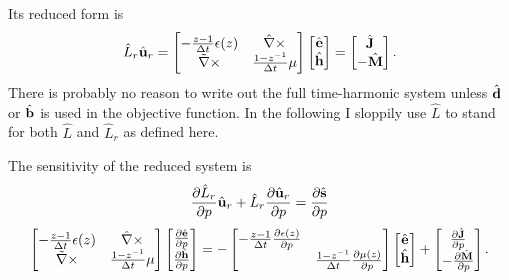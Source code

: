 %
Its reduced form is
%
\begin{equation}
	\hat{L}_r \hat{\textbf{u}}_r =
	\begin{bmatrix}
	-\frac{z - 1}{\Delta t} \epsilon(z) & \hat{\nabla}\times \\
	\tilde{\nabla}\times & \frac{1 - z^{-1}}{\Delta t} \mu
	\end{bmatrix}
	\begin{bmatrix} \hat{\textbf{e}} \\ \hat{\textbf{h}} \end{bmatrix}
	=
	\begin{bmatrix} \hat{\textbf{J}} \\ -\hat{\textbf{M}} \end{bmatrix}.
\end{equation}
%
There is probably no reason to write out the full time-harmonic system unless $\hat{\textbf{d}}$ or $\hat{\textbf{b}}$ is used in the objective function.  In the following I sloppily use $\hat{L}$ to stand for both $\hat{L}$ and $\hat{L}_r$ as defined here.

The sensitivity of the reduced system is
%
\begin{equation}
	\frac{\partial{\hat{L}_r}}{\partial{p}} \hat{\textbf{u}}_r + \hat{L}_r \frac{\partial{\hat{\textbf{u}}_r}}{\partial{p}} = \frac{\partial{\hat{\textbf{s}}}}{\partial{p}}
\end{equation}
%
\begin{equation}
	\begin{bmatrix}
	-\frac{z - 1}{\Delta t} \epsilon(z) & \hat{\nabla}\times \\
	\tilde{\nabla}\times & \frac{1 - z^{-1}}{\Delta t} \mu
	\end{bmatrix}
	\begin{bmatrix}
	\frac{\partial{\hat{\textbf{e}}}}{\partial{p}} \\ \frac{\partial{\hat{\textbf{h}}}}{\partial{p}}
	\end{bmatrix}
	=
	- \begin{bmatrix}
	-\frac{z-1}{\Delta t} \frac{\partial{\epsilon(z)}}{\partial{p}} & \\
	& \frac{1 - z^{-1}}{\Delta t} \frac{\partial{\mu(z)}}{\partial{p}}
	\end{bmatrix}
	\begin{bmatrix} \hat{\textbf{e}} \\ \hat{\textbf{h}} \end{bmatrix}
	+ 
	\begin{bmatrix} \frac{\partial{\hat{\textbf{J}}}}{\partial{p}} \\ - \frac{\partial{\hat{\textbf{M}}}}{\partial{p}} \end{bmatrix}.
\end{equation}

